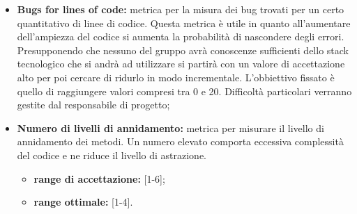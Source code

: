 \begin{itemize}
				\item \textbf{Bugs for lines of code:} metrica per la misura dei bug trovati per un certo quantitativo di linee di codice. Questa metrica è utile in quanto all'aumentare dell'ampiezza del codice si aumenta la probabilità di nascondere degli errori. Presupponendo che nessuno del gruppo avrà conoscenze sufficienti dello stack tecnologico che si andrà ad utilizzare si partirà con un valore di accettazione alto per poi cercare di ridurlo in modo incrementale. L'obbiettivo fissato è quello di raggiungere valori compresi tra 0 e 20. Difficoltà particolari verranno gestite dal responsabile di progetto;
				\item \textbf{Numero di livelli di annidamento:} metrica per misurare il livello di annidamento dei metodi. Un numero elevato comporta eccessiva complessità del codice e ne riduce il livello di astrazione.
				\begin{itemize}
					\item \textbf{range di accettazione:} [1-6];
					\item \textbf{range ottimale:} [1-4].
				\end{itemize}
				
			\end{itemize}

	\pagebreak
